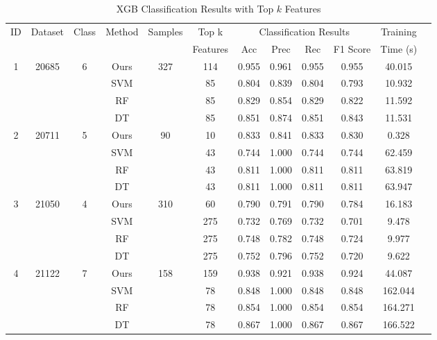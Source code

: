 \begin{table}[htbp]
  \centering
  \caption{XGB Classification Results with Top $k$ Features}
  \label{tab:XGB_results}
  \scriptsize
  \begin{tabular}{cccccccccccc}
    \toprule
    ID & Dataset & Class & Method & Samples & \multicolumn{1}{c}{Top k} & \multicolumn{4}{c}{Classification Results} & {Training} \\
    \cmidrule(lr){7-10} 
        &         &       &         &   & Features & Acc & Prec & Rec & F1 Score & Time (s)  \\
  \midrule
        1  & 20685 & 6 & Ours & 327 & 114 & 0.955 & 0.961 & 0.955 & 0.955 & 40.015 \\
           &       &   & SVM  &     & 85  & 0.804 & 0.839 & 0.804 & 0.793 & 10.932 \\
           &       &   & RF   &     & 85  & 0.829 & 0.854 & 0.829 & 0.822 & 11.592 \\
           &       &   & DT   &     & 85  & 0.851 & 0.874 & 0.851 & 0.843 & 11.531 \\
        \midrule
        2  & 20711 & 5 & Ours & 90  & 10  & 0.833 & 0.841 & 0.833 & 0.830 & 0.328 \\
           &       &   & SVM  &     & 43  & 0.744 & 1.000 & 0.744 & 0.744 & 62.459 \\
           &       &   & RF   &     & 43  & 0.811 & 1.000 & 0.811 & 0.811 & 63.819 \\
           &       &   & DT   &     & 43  & 0.811 & 1.000 & 0.811 & 0.811 & 63.947 \\
        \midrule
        3  & 21050 & 4 & Ours & 310 & 60  & 0.790 & 0.791 & 0.790 & 0.784 & 16.183 \\
           &       &   & SVM  &     & 275 & 0.732 & 0.769 & 0.732 & 0.701 & 9.478 \\
           &       &   & RF   &     & 275 & 0.748 & 0.782 & 0.748 & 0.724 & 9.977 \\
           &       &   & DT   &     & 275 & 0.752 & 0.796 & 0.752 & 0.720 & 9.622 \\
        \midrule
        4  & 21122 & 7 & Ours & 158 & 159 & 0.938 & 0.921 & 0.938 & 0.924 & 44.087 \\
           &       &   & SVM  &     & 78  & 0.848 & 1.000 & 0.848 & 0.848 & 162.044 \\
           &       &   & RF   &     & 78  & 0.854 & 1.000 & 0.854 & 0.854 & 164.271 \\
           &       &   & DT   &     & 78  & 0.867 & 1.000 & 0.867 & 0.867 & 166.522 \\

\end{tabular}
\end{table}
